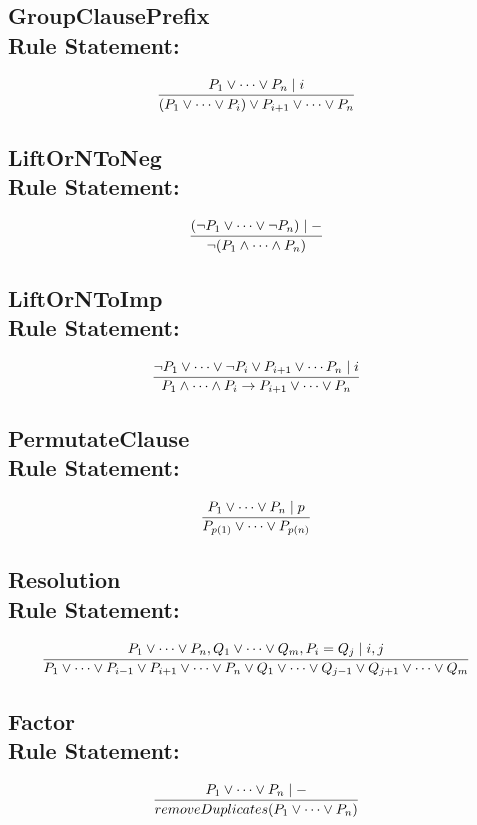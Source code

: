 \subsection*{GroupClausePrefix\\\normalsize{Rule Statement:}}
\[
  \infer[]{(P_{1} \vee \cdots \vee P_{i}) \vee P_{i + 1} \vee \cdots \vee P_{n}}
    {P_{1} \vee \cdots \vee P_{n} \mid i}
\]

\subsection*{LiftOrNToNeg\\\normalsize{Rule Statement:}}
\[
  \infer[]{\neg (P_{1} \wedge \cdots \wedge P_{n})}{(\neg P_{1} \vee \cdots \vee \neg P_{n}) \mid -}
\]


\subsection*{LiftOrNToImp\\\normalsize{Rule Statement:}}
\[
  \infer[]{P_{1} \wedge \cdots \wedge P_{i} \rightarrow P_{i + 1} \vee \cdots \vee P_{n}}{\neg P_{1} \vee \cdots \vee \neg P_{i} \vee P_{i + 1} \vee \cdots P_{n} \mid i}
\]

\subsection*{PermutateClause\\\normalsize{Rule Statement:}}
\[
  \infer[]{P_{p(1)} \vee \cdots \vee P_{p(n)}}{P_{1} \vee \cdots \vee P_{n} \mid p}
\]

\subsection*{Resolution\\\normalsize{Rule Statement:}}
\[
  \infer[]{P_{1} \vee \cdots \vee P_{i - 1} \vee P_{i + 1} \vee \cdots \vee P_{n} \vee Q_{1} \vee \cdots \vee Q_{j - 1} \vee Q_{j + 1} \vee \cdots \vee Q_{m}}{P_{1} \vee \cdots \vee P_{n}, Q_{1} \vee \cdots \vee Q_{m}, P_{i} = Q_{j} \mid i, j}
\]

\subsection*{Factor\\\normalsize{Rule Statement:}}
\[
  \infer[]{removeDuplicates(P_{1} \vee \cdots \vee P_{n})}{P_{1} \vee \cdots \vee P_{n} \mid -}
\]


